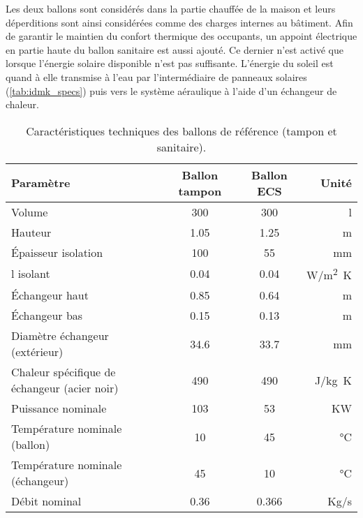 Les deux ballons sont considérés dans la partie chauffée de la maison et leurs
déperditions sont ainsi considérées comme des charges internes au bâtiment. Afin de
garantir le maintien du confort thermique des occupants, un appoint électrique en partie
haute du ballon sanitaire est aussi ajouté. Ce dernier n’est activé que lorsque l’énergie
solaire disponible n’est pas suffisante. L’énergie du soleil est quand à elle transmise à
l’eau par l’intermédiaire de panneaux solaires (\autoref{tab:idmk_specs}) puis vers le
système aéraulique à l’aide d’un échangeur de chaleur.

\begin{table}
\centering
\begin{tabular}{l*{2}{c}r}
    \toprule
    Paramètre & Ballon tampon & Ballon ECS & Unité\\
    \midrule
    Volume                                       & 300   & 300    & \si{l}              \\
    Hauteur                                      & 1.05  & 1.25   & \si{m}              \\
    Épaisseur isolation                          & 100   & 55     & \si{mm}             \\
    \textgreek{l} isolant                        & 0.04  & 0.04   & \si{W/m^{2}.K}      \\
    Échangeur haut                               & 0.85  & 0.64   & \si{m}              \\
    Échangeur bas                                & 0.15  & 0.13   & \si{m}              \\
    Diamètre échangeur (extérieur)               & 34.6  & 33.7   & \si{mm}             \\
    Chaleur spécifique de échangeur (acier noir) & 490   & 490    & \si{J/kg.K}         \\
    Puissance nominale                           & 103   & 53     & \si{KW}             \\
    Température nominale (ballon)                & 10    & 45     & \si{\degreeCelsius} \\
    Température nominale (échangeur)             & 45    & 10     & \si{\degreeCelsius} \\
    Débit nominal                                & 0.36  & 0.366  & \si{Kg/s}           \\
    \bottomrule
\end{tabular}
\caption{Caractéristiques techniques des ballons de référence (tampon et sanitaire).
         \label{tab:tanks_specs}}
\end{table}

